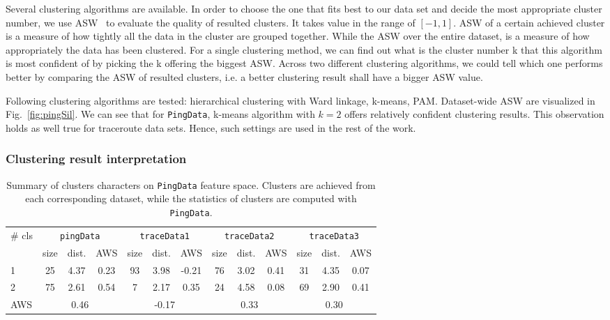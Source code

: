 Several clustering algorithms are available. 
In order to choose the one that fits best to our data set and decide the most appropriate cluster number, we use \acf{ASW}~\cite{Rousseeuw1987} to evaluate the quality of resulted clusters. 
It takes value in the range of $[-1,1]$. 
\ac{ASW} of a certain achieved cluster is a measure of how tightly all the data in the cluster are grouped together. 
While the \ac{ASW} over the entire dataset, is a measure of how appropriately the data has been clustered. For a single clustering method, we can find out what is the cluster number k that this algorithm is most confident of by picking the k offering the biggest \ac{ASW}. Across two different clustering algorithms, we could tell which one performs better by comparing the \ac{ASW} of resulted clusters, i.e. a better clustering result shall have a bigger \ac{ASW} value.

Following clustering algorithms are tested: hierarchical clustering with Ward linkage, k-means, \ac{PAM}.
Dataset-wide \ac{ASW} are visualized in Fig.~\ref{fig:pingSil}. We can see that for \texttt{PingData}, k-means algorithm with $k=2$ offers relatively confident clustering results. 
This observation holds as well true for traceroute data sets.
Hence, such settings are used in the rest of the work.


\subsubsection{Clustering result interpretation}

\begin{table}[!htb]
\centering
\footnotesize
\setlength{\tabcolsep}{0.5em}
\begin{tabular}{l|ccc|ccc|ccc|ccc}
\toprule
\multirow{2}{*}{\# cls} & \multicolumn{3}{c|}{\texttt{pingData}} & \multicolumn{3}{c|}{\texttt{traceData1}} & \multicolumn{3}{c|}{\texttt{traceData2}} & \multicolumn{3}{c}{\texttt{traceData3}}\\
& size & dist. & AWS & size & dist. & AWS & size & dist. & AWS & size& dist. & AWS\\
\midrule
1 & 25 & 4.37 & 0.23 & 93 & 3.98 & -0.21 & 76 & 3.02 & 0.41 & 31 & 4.35 & 0.07\\
2 & 75 & 2.61 & 0.54 & 7  & 2.17 & 0.35  & 24 & 4.58 & 0.08 & 69 & 2.90 & 0.41\\ 
\midrule
AWS &\multicolumn{3}{c|}{0.46} & \multicolumn{3}{c|}{-0.17} & \multicolumn{3}{c|}{0.33} & \multicolumn{3}{c}{0.30}\\
\bottomrule
\end{tabular}
\caption{Summary of clusters characters on \texttt{PingData} feature space. Clusters are achieved from each corresponding dataset, while the statistics of clusters are computed with \texttt{PingData}.}
\label{tab:summary_cls}
\end{table}

